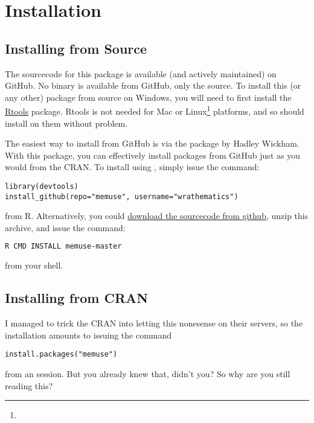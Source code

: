 \section{Installation}

\subsection{Installing from Source}

The sourcecode for this package is available (and actively maintained) on 
GitHub.  No binary is available from GitHub, only the source.  To install this 
(or any other) package from source on Windows, you will need to first install 
the \href{http://cran.r-project.org/bin/windows/Rtools/Rtools216.exe}{Rtools} 
package.  Rtools is not needed for Mac or Linux\footnote{\interject} 
platforms, and so  should install on them without problem.

The easiest way to install  from GitHub is via the \href{http://cran.r-project.org/web/packages/devtools/index.html}{} package by Hadley Wickham.  With this package, you can effectively install packages from GitHub just as you would from the CRAN.  To install  using , simply issue the command:
\begin{lstlisting}[language=rr]
library(devtools)
install_github(repo="memuse", username="wrathematics")
\end{lstlisting}
from R.  Alternatively, you could  
\href{https://github.com/wrathematics/memuse/archive/master.zip}{download the 
sourcecode from github}, unzip this archive, and issue the command:
\begin{lstlisting}[language=sh]
R CMD INSTALL memuse-master
\end{lstlisting}
from your shell.


\subsection{Installing from CRAN}

I managed to trick the CRAN into letting this nonesense on their servers, 
so the installation amounts to issuing the command
\begin{lstlisting}[language=rr]
install.packages("memuse")
\end{lstlisting}
from an \R session.  But you already knew that, didn't you?  So why are you 
still reading this?